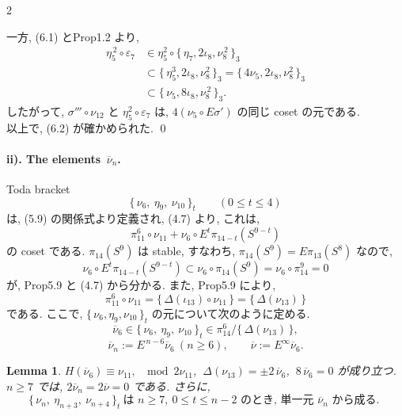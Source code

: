 \documentclass[10pt, leqno]{ltjsarticle}
\newcommand{\todai}[2][]{\{\,#2\,\}_{#1}}      %
\newcommand{\gen}[1]{\{\,#1\,\}}       %
\newcommand{\pis}[2]{\pi_{#1}(#2)}       %
\newcommand{\pit}[2]{\pi_{#1}^{#2}}
\numberwithin{equation}{section}
\theoremstyle{plain}
\newtheorem{lemma}[theorem]{Lemma}
\theoremstyle{definition}
\theoremstyle{remark}
\begin{document}
\begin{paracol}{2}

\noindent
一方, (6.1) とProp1.2 より,
\[
\begin{align*}
\eta_5^{\,2}\circ \varepsilon_7
&\in \eta_5^2\circ\todai[3]{\eta_7,2\iota_8,\nu_8^{\,2}} \\
&\subset \todai[3]{\eta_5^3, 2\iota_8, \nu_8^2}
= \todai[3]{4\nu_5, 2\iota_8, \nu_8^2}\\
&\subset \todai[3]{\nu_5,8\iota_8,\nu_8^{\,2}} .
\end{align*}
\]
したがって, 
\(\sigma''' \circ\nu_{12}\) と \(\eta_5^2\circ\varepsilon_7\) は, 
\(4(\nu_5\circ E\sigma')\) の同じ coset の元である. \\
以上で, (6.2) が確かめられた. 
\qed



\paragraph{ii). The elements \(\,\overline{\nu}_n\).}

Toda bracket 
\[
\todai[t]{\nu_6,\ \eta_9,\ \nu_{10}}\qquad(0\le t\le 4)
\]
は, (5.9) の関係式より定義され,  (4.7) より, これは,
\[
\pi^{6}_{11}\circ \nu_{11}+\nu_6\circ E^t\pis{14-t}{S^{9-t}}
\]
の coset である. 
\(\pis{14}{S^9}\) は stable, すなわち, 
\(\pis{14}{S^9} = E\pis{13}{S^8}\)
なので, 
\[
\nu_6\circ E^t\pis{14-t}{S^{9-t}} 
\subset\nu_6\circ\pis{14}{S^9} 
=\nu_6\circ \pit{14}{9} = 0
\]
が, Prop5.9 と (4.7) から分かる. 
また, Prop5.9 により, 
\[
\pi^{6}_{11}\circ \nu_{11}=\gen{\Delta(\iota_{13})\circ \nu_{11}}
=\gen{\Delta(\nu_{13})}
\]
である. ここで, 
\(\todai[t]{\nu_6, \eta_9, \nu_{10}}\) 
の元について次のように定める.
\[
\overline{\nu}_6 \in \todai[t]{\nu_6,\ \eta_9,\ \nu_{10}}
\in \pit{14}{6} / \gen{\Delta(\nu_{13})},
\]
\[
\overline{\nu}_n:=E^{\,n-6}\overline{\nu}_6\ (n\ge6),\qquad
\overline{\nu}:=E^{\infty}\overline{\nu}_6.
\]

\begin{lemma}\label{lem:6.2}
\(H(\overline{\nu}_6)\equiv\nu_{11},\ \mod 2\nu_{11}\text{}\), 
\(\ \Delta(\nu_{13})=\pm 2\,\overline{\nu}_6\), 
\(\ 8\,\overline{\nu}_6=0\) が成り立つ. \\
\(n\ge7\) では,
\(2\overline{\nu}_n=2\overline{\nu}=0\) である. さらに,
\[
\todai[t]{\nu_n,\ \eta_{n+3},\ \nu_{n+4}}\ \text{は }n\ge7,\ 0\le t\le n-2\text{ のとき, 単一元 }\overline{\nu}_n\text{ から成る. }
\]
\end{lemma}


\end{paracol}
\end{document}
